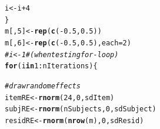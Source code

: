 \documentclass{sp}\usepackage[]{graphicx}\usepackage[]{color}
\makeatletter
\newcommand{\hlnum}[1]{\textcolor[rgb]{0.686,0.059,0.569}{#1}}%
\newcommand{\hlcom}[1]{\textcolor[rgb]{0.678,0.584,0.686}{\textit{#1}}}%
\newcommand{\hlopt}[1]{\textcolor[rgb]{0,0,0}{#1}}%
\newcommand{\hlstd}[1]{\textcolor[rgb]{0.345,0.345,0.345}{#1}}%
\newcommand{\hlkwa}[1]{\textcolor[rgb]{0.161,0.373,0.58}{\textbf{#1}}}%
\newcommand{\hlkwb}[1]{\textcolor[rgb]{0.69,0.353,0.396}{#1}}%
\newcommand{\hlkwc}[1]{\textcolor[rgb]{0.333,0.667,0.333}{#1}}%
\newcommand{\hlkwd}[1]{\textcolor[rgb]{0.737,0.353,0.396}{\textbf{#1}}}%
\newenvironment{kframe}{%
 \def\at@end@of@kframe{}%
 \ifinner\ifhmode%
  \def\at@end@of@kframe{\end{minipage}}%
  \begin{minipage}{\columnwidth}%
 \fi\fi%
 \def\FrameCommand##1{\hskip\@totalleftmargin \hskip-\fboxsep
 \colorbox{shadecolor}{##1}\hskip-\fboxsep
     \hskip-\linewidth \hskip-\@totalleftmargin \hskip\columnwidth}%
 \MakeFramed {\advance\hsize-\width
   \@totalleftmargin\z@ \linewidth\hsize
   \@setminipage}}%
 {\par\unskip\endMakeFramed%
 \at@end@of@kframe}
\newenvironment{knitrout}{}{} %
\makeatother
\begin{document}
\begin{knitrout}
\begin{kframe}
\begin{alltt}
        \hlstd{i} \hlkwb{<-} \hlstd{i} \hlopt{+} \hlnum{4}
    \hlstd{\}}
    \hlstd{m[,} \hlnum{5}\hlstd{]} \hlkwb{<-} \hlkwd{rep}\hlstd{(}\hlkwd{c}\hlstd{(}\hlopt{-}\hlnum{0.5}\hlstd{,} \hlnum{0.5}\hlstd{))}
    \hlstd{m[,} \hlnum{6}\hlstd{]} \hlkwb{<-} \hlkwd{rep}\hlstd{(}\hlkwd{c}\hlstd{(}\hlopt{-}\hlnum{0.5}\hlstd{,} \hlnum{0.5}\hlstd{),} \hlkwc{each} \hlstd{=} \hlnum{2}\hlstd{)}
    \hlcom{# i <- 1 # (when testing for-loop)}
    \hlkwa{for} \hlstd{(i} \hlkwa{in} \hlnum{1}\hlopt{:}\hlstd{nIterations) \{}

        \hlcom{# draw random effects}
        \hlstd{itemRE} \hlkwb{<-} \hlkwd{rnorm}\hlstd{(}\hlnum{24}\hlstd{,} \hlnum{0}\hlstd{, sdItem)}
        \hlstd{subjRE} \hlkwb{<-} \hlkwd{rnorm}\hlstd{(nSubjects,} \hlnum{0}\hlstd{, sdSubject)}
        \hlstd{residRE} \hlkwb{<-} \hlkwd{rnorm}\hlstd{(}\hlkwd{nrow}\hlstd{(m),} \hlnum{0}\hlstd{, sdResid)}


\end{alltt}
\end{kframe}
\end{knitrout}
\end{document}
